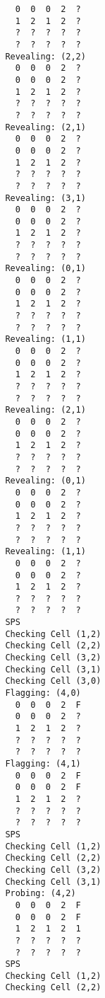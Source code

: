 \documentclass[british]{article}
\begin{document}
\begin{lstlisting}
                 0  0  0  2  ?
                 1  2  1  2  ?
                 ?  ?  ?  ?  ?
                 ?  ?  ?  ?  ?
               Revealing: (2,2)
                 0  0  0  2  ?
                 0  0  0  2  ?
                 1  2  1  2  ?
                 ?  ?  ?  ?  ?
                 ?  ?  ?  ?  ?
               Revealing: (2,1)
                 0  0  0  2  ?
                 0  0  0  2  ?
                 1  2  1  2  ?
                 ?  ?  ?  ?  ?
                 ?  ?  ?  ?  ?
               Revealing: (3,1)
                 0  0  0  2  ?
                 0  0  0  2  ?
                 1  2  1  2  ?
                 ?  ?  ?  ?  ?
                 ?  ?  ?  ?  ?
               Revealing: (0,1)
                 0  0  0  2  ?
                 0  0  0  2  ?
                 1  2  1  2  ?
                 ?  ?  ?  ?  ?
                 ?  ?  ?  ?  ?
               Revealing: (1,1)
                 0  0  0  2  ?
                 0  0  0  2  ?
                 1  2  1  2  ?
                 ?  ?  ?  ?  ?
                 ?  ?  ?  ?  ?
               Revealing: (2,1)
                 0  0  0  2  ?
                 0  0  0  2  ?
                 1  2  1  2  ?
                 ?  ?  ?  ?  ?
                 ?  ?  ?  ?  ?
               Revealing: (0,1)
                 0  0  0  2  ?
                 0  0  0  2  ?
                 1  2  1  2  ?
                 ?  ?  ?  ?  ?
                 ?  ?  ?  ?  ?
               Revealing: (1,1)
                 0  0  0  2  ?
                 0  0  0  2  ?
                 1  2  1  2  ?
                 ?  ?  ?  ?  ?
                 ?  ?  ?  ?  ?
               SPS
               Checking Cell (1,2)
               Checking Cell (2,2)
               Checking Cell (3,2)
               Checking Cell (3,1)
               Checking Cell (3,0)
               Flagging: (4,0)
                 0  0  0  2  F
                 0  0  0  2  ?
                 1  2  1  2  ?
                 ?  ?  ?  ?  ?
                 ?  ?  ?  ?  ?
               Flagging: (4,1)
                 0  0  0  2  F
                 0  0  0  2  F
                 1  2  1  2  ?
                 ?  ?  ?  ?  ?
                 ?  ?  ?  ?  ?
               SPS
               Checking Cell (1,2)
               Checking Cell (2,2)
               Checking Cell (3,2)
               Checking Cell (3,1)
               Probing: (4,2)
                 0  0  0  2  F
                 0  0  0  2  F
                 1  2  1  2  1
                 ?  ?  ?  ?  ?
                 ?  ?  ?  ?  ?
               SPS
               Checking Cell (1,2)
               Checking Cell (2,2)

\end{lstlisting}
\end{document}
